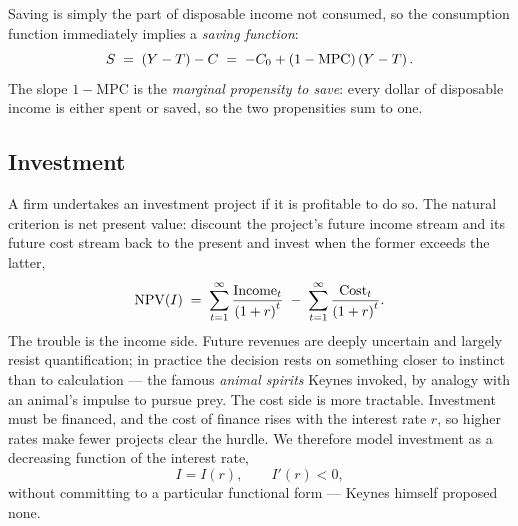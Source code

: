 Saving is simply the part of disposable income not consumed, so the consumption function immediately implies a \emph{saving function}:
\[
S \;=\; \left(Y - T\right) - C \;=\; -C_0 + \left(1 - \mathrm{MPC}\right)\left(Y - T\right).
\]
The slope $1 - \mathrm{MPC}$ is the \emph{marginal propensity to save}: every dollar of disposable income is either spent or saved, so the two propensities sum to one.

\subsection{Investment}

A firm undertakes an investment project if it is profitable to do so. The natural criterion is net present value: discount the project's future income stream and its future cost stream back to the present and invest when the former exceeds the latter,
\[
\mathrm{NPV}(I) \;=\; \sum_{t=1}^{\infty} \frac{\text{Income}_t}{\left(1 + r\right)^{t}} \;-\; \sum_{t=1}^{\infty} \frac{\text{Cost}_t}{\left(1 + r\right)^{t}}.
\]
The trouble is the income side. Future revenues are deeply uncertain and largely resist quantification; in practice the decision rests on something closer to instinct than to calculation --- the famous \emph{animal spirits} Keynes invoked, by analogy with an animal's impulse to pursue prey. The cost side is more tractable. Investment must be financed, and the cost of finance rises with the interest rate $r$, so higher rates make fewer projects clear the hurdle. We therefore model investment as a decreasing function of the interest rate,
\[
I = I(r), \qquad I'(r) < 0,
\]
without committing to a particular functional form --- Keynes himself proposed none.



